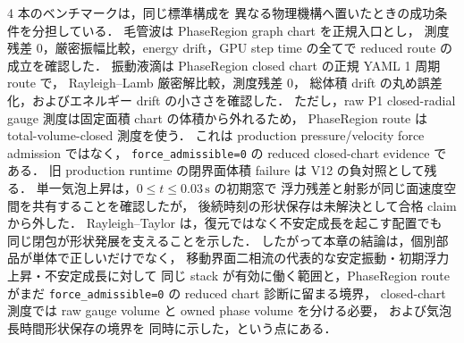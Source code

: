 4 本のベンチマークは，同じ標準構成を
異なる物理機構へ置いたときの成功条件を分担している．
毛管波は PhaseRegion graph chart を正規入口とし，
測度残差 0，厳密振幅比較，energy drift，GPU step time の全てで
reduced route の成立を確認した．
振動液滴は PhaseRegion closed chart の正規 YAML 1 周期 route で，
Rayleigh--Lamb 厳密解比較，測度残差 0，
総体積 drift の丸め誤差化，およびエネルギー drift の小ささを確認した．
ただし，raw P1 closed-radial gauge 測度は固定面積 chart の体積から外れるため，
PhaseRegion route は total-volume-closed 測度を使う．
これは production pressure/velocity force admission ではなく，
\texttt{force\_admissible=0} の reduced closed-chart evidence である．
旧 production runtime の閉界面体積 failure は V12 の負対照として残る．
単一気泡上昇は，$0\le t\le0.03\,\mathrm{s}$ の初期窓で
浮力残差と射影が同じ面速度空間を共有することを確認したが，
後続時刻の形状保存は未解決として合格 claim から外した．
Rayleigh--Taylor は，復元ではなく不安定成長を起こす配置でも
同じ閉包が形状発展を支えることを示した．
したがって本章の結論は，個別部品が単体で正しいだけでなく，
移動界面二相流の代表的な安定振動・初期浮力上昇・不安定成長に対して
同じ stack が有効に働く範囲と，PhaseRegion route がまだ
\texttt{force\_admissible=0} の reduced chart 診断に留まる境界，
closed-chart 測度では raw gauge volume と owned phase volume を分ける必要，
および気泡長時間形状保存の境界を
同時に示した，という点にある．
